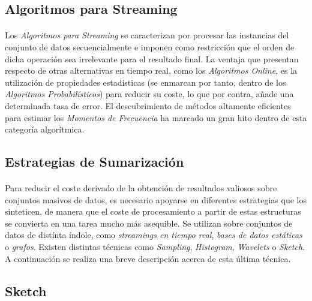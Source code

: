 \documentclass{subfiles}
\begin{document}
      \subsection{Algoritmos para Streaming}

        \paragraph{}
        Los \emph{Algoritmos para Streaming} se caracterizan por procesar las instancias del conjunto de datos secuencialmente e imponen como restricción que el orden de dicha operación sea irrelevante para el resultado final. La ventaja que presentan respecto de otras alternativas en tiempo real, como los \emph{Algoritmos Online}, es la utilización de propiedades estadísticas (se enmarcan por tanto, dentro de los \emph{Algoritmos Probabilísticos}) para reducir su coste, lo que por contra, añade una determinada tasa de error. El descubrimiento de métodos altamente eficientes para estimar los \emph{Momentos de Frecuencia} ha marcado un gran hito dentro de esta categoría algorítmica.

      \subsection{Estrategias de Sumarización}

        \paragraph{}
        Para reducir el coste derivado de la obtención de resultados valiosos sobre conjuntos masivos de datos, es necesario apoyarse en diferentes estrategias que los sinteticen, de manera que el coste de procesamiento a partir de estas estructuras se convierta en una tarea mucho más asequible. Se utilizan sobre conjuntos de datos de distínta índole, como \emph{streamings en tiempo real}, \emph{bases de datos estáticas} o \emph{grafos}. Existen distintas técnicas como \emph{Sampling}, \emph{Histogram}, \emph{Wavelets} o \emph{Sketch}. A continuación se realiza una breve descripción acerca de esta última técnica.

        \subsection{Sketch}
\end{document}
